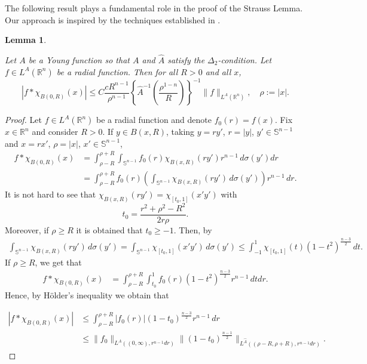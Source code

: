 \documentclass[leqno,twoside, 12pt]{amsart}
\theoremstyle{plain}
\numberwithin{equation}{section} \numberwithin{figure}{section}
\newtheorem{lemma}[theorem]{Lemma}
\theoremstyle{definition}
\newcommand{\R}{\mathbb R}
\numberwithin{equation}{section}
\begin{document}
The following result plays a fundamental role in the proof of the Strauss Lemma. Our approach is inspired by the techniques established in \cite{EP}.


\begin{lemma} \label{lema.strauss}

Let $A$ be a Young function so that $A$ and $\hat A$ satisfy the $\Delta_2$-condition. Let $f\in L^A(\R^n)$ be a radial function.  Then for all $R>0$ and all $x$,
$$
|f*\chi_{B(0,R)}(x)|\leq C   \frac{cR^{n-1}}{\rho^{n-1}} \left\{\hat A^{-1}\left( \frac{\rho^{1-n}}{R}\right) \right\}^{-1} \|f\|_{L^A(\R^n)} , \quad  \rho:=|x|.
$$
\end{lemma}



\begin{proof}
Let $f\in L^A(\R^n)$ be a radial function and denote $f_0(r)=f(x)$. Fix $x\in \R^n$ and consider $R>0$. If $y\in B(x,R)$, taking $y=ry'$, $r=|y|$, $y'\in \mathbb{S}^{n-1}$ and $x=rx'$, $\rho=|x|$, $x'\in \mathbb{S}^{n-1}$,
\begin{align*}
f*\chi_{B(0,R)}(x)&=\int_{\rho-R}^{\rho+R} \int_{\mathbb{S}^{n-1}} f_0(r) \chi_{B(x,R)}(ry') r^{n-1} \,d\sigma(y')dr\\ 
&= 
\int_{\rho-R}^{\rho+R} f_0(r) \left(\int_{\mathbb{S}^{n-1}}  \chi_{B(x,R)}(ry') \,d \sigma(y')\right)r^{n-1}\,dr.
\end{align*}
It is not hard to see that $\chi_{B(x,R)}(ry')=\chi_{[t_0,1]}(x'y')$ with $$t_0=\frac{r^2 +   \rho^2 - R^2}{2r\rho}.$$
Moreover, if $\rho\geq R$ it is obtained that $t_0\geq -1$. Then, by \cite[Apprndix D.3]{grafakos}
\begin{align*}
\int_{\mathbb{S}^{n-1}}  \chi_{B(x,R)}(ry') \,d \sigma(y') = \int_{\mathbb{S}^{n-1}} \chi_{[t_0,1]}(x'y')\,d\sigma(y')  \leq  \int_{-1}^1 \chi_{[t_0,1]}(t)(1-t^2)^\frac{n-3}{2}\,dt.
\end{align*}
If $\rho\geq R$, we get that
\begin{align*}
f*\chi_{B(0,R)}(x) &=  \int_{\rho-R}^{\rho+R} \int_{t_0}^1 f_0(r) (1-t^2)^\frac{n-3}{2}r^{n-1}\,dtdr.
\end{align*}
Hence, by H\"older's inequality we obtain that

\begin{align*}
|f*\chi_{B(0,R)}(x)|&\leq \int_{\rho-R}^{\rho+R} |f_0(r)|(1-t_0)^\frac{n-3}{2} r^{n-1}\,dr\\ 
&\leq 
\|f_0\|_{L^A((0,\infty), r^{n-1}dr)} \|(1-t_0)^\frac{n-1}{2}\|_{L^{\hat A}((\rho-R,\rho+R), r^{n-1}dr)}.
\end{align*}


\end{proof}
\end{document}
